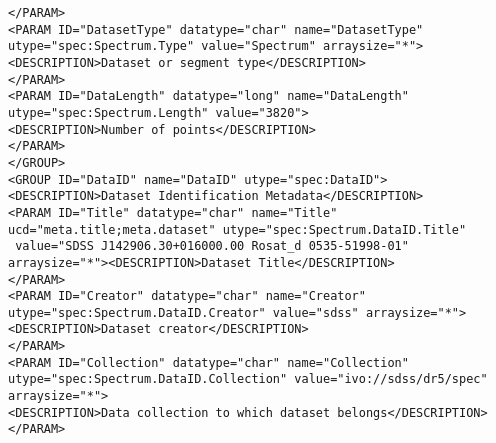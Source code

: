 \begin{landscape}
{\begin{flushleft}
\begin{fmlpage}
\begin{verbatim}
</PARAM>
<PARAM ID="DatasetType" datatype="char" name="DatasetType" utype="spec:Spectrum.Type" value="Spectrum" arraysize="*">
<DESCRIPTION>Dataset or segment type</DESCRIPTION>
</PARAM>
<PARAM ID="DataLength" datatype="long" name="DataLength" utype="spec:Spectrum.Length" value="3820">
<DESCRIPTION>Number of points</DESCRIPTION>
</PARAM>
</GROUP>
<GROUP ID="DataID" name="DataID" utype="spec:DataID">
<DESCRIPTION>Dataset Identification Metadata</DESCRIPTION>
<PARAM ID="Title" datatype="char" name="Title" ucd="meta.title;meta.dataset" utype="spec:Spectrum.DataID.Title" 
 value="SDSS J142906.30+016000.00 Rosat_d 0535-51998-01" arraysize="*"><DESCRIPTION>Dataset Title</DESCRIPTION>
</PARAM>
<PARAM ID="Creator" datatype="char" name="Creator" utype="spec:Spectrum.DataID.Creator" value="sdss" arraysize="*">
<DESCRIPTION>Dataset creator</DESCRIPTION>
</PARAM>
<PARAM ID="Collection" datatype="char" name="Collection" utype="spec:Spectrum.DataID.Collection" value="ivo://sdss/dr5/spec" arraysize="*">
<DESCRIPTION>Data collection to which dataset belongs</DESCRIPTION>
</PARAM>
\end{verbatim}
\end{fmlpage}


\end{flushleft}}
\end{landscape}

